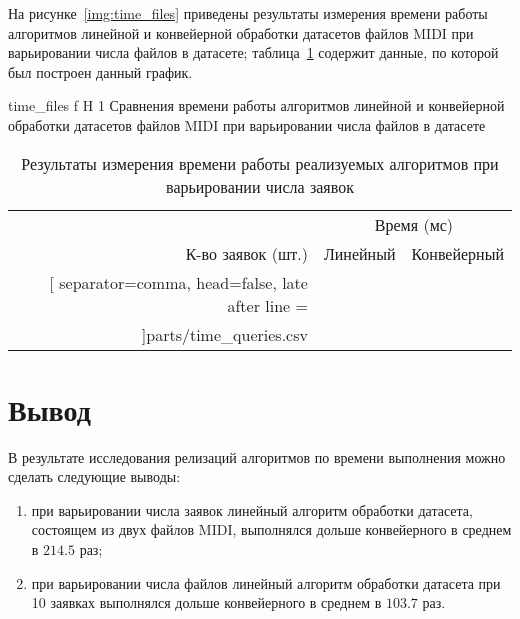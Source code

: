 На рисунке~\ref{img:time_files} приведены результаты измерения времени работы алгоритмов линейной и конвейерной обработки датасетов файлов MIDI при варьировании числа файлов в датасете; таблица~\ref{tbl:time_files} содержит данные, по которой был построен данный график.

	{time_files}
	{f}
	{H}
	{1\textwidth}
	{Сравнения времени работы алгоритмов линейной и конвейерной обработки датасетов файлов MIDI при варьировании числа файлов в датасете}
	
\begin{table}[H]
	\centering
	\caption{Результаты измерения времени работы реализуемых алгоритмов при варьировании числа заявок}
	\label{tbl:time_files}
	\begin{tabular}{|r|r|r|}
		\hline
		~ & \multicolumn{2}{c|}{Время (мс)} \\
		\cline{2-3}
		К-во заявок (шт.) & Линейный & Конвейерный \\ \hline
		\csvreader[
		separator=comma,
		head=false,
		late after line = \\\hline
		]{parts/time_queries.csv}{}{%
			\csvcoli & \csvcolii & \csvcoliii  
		}
	\end{tabular}
\end{table}

\section{Вывод}

В результате исследования релизаций алгоритмов по времени выполнения можно сделать следующие выводы:
\begin{enumerate}
	\item при варьировании числа заявок линейный алгоритм обработки датасета, состоящем из двух файлов MIDI, выполнялся дольше конвейерного в среднем в $214.5$ раз;
	\item при варьировании числа файлов линейный алгоритм обработки датасета при 10 заявках выполнялся дольше конвейерного в среднем в $103.7$ раз.
\end{enumerate}
